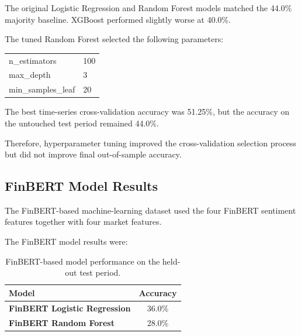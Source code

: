 \documentclass[10pt,a4paper]{article}
\begin{document}
	The original Logistic Regression and Random Forest models matched the
	44.0\% majority baseline. XGBoost performed slightly worse at 40.0\%.
	
	The tuned Random Forest selected the following parameters:
	
	\begin{center}
		\small
		\begin{tabular}{>{\ttfamily}l l}
			\toprule
			n\_estimators & 100 \\
			max\_depth & 3 \\
			min\_samples\_leaf & 20 \\
			\bottomrule
		\end{tabular}
	\end{center}
	
	The best time-series cross-validation accuracy was 51.25\%, but the
	accuracy on the untouched test period remained 44.0\%.
	
	Therefore, hyperparameter tuning improved the cross-validation
	selection process but did not improve final out-of-sample accuracy.
	
	\subsection{FinBERT Model Results}
	
	The FinBERT-based machine-learning dataset used the four FinBERT
	sentiment features together with four market features.
	
	The FinBERT model results were:
	
	\begin{table}[H]
		\centering
		\caption{FinBERT-based model performance on the held-out test period.}
		
		\vspace{2pt}
		
		\begin{tabular}{>{\bfseries}l c}
			\toprule
			\rowcolor{Navy}
			\color{white}\textbf{Model} &
			\color{white}\textbf{Accuracy} \\
			\midrule
			FinBERT Logistic Regression & 36.0\% \\
			FinBERT Random Forest & 28.0\% \\
			\bottomrule
		\end{tabular}
	\end{table}
	
\end{document}
